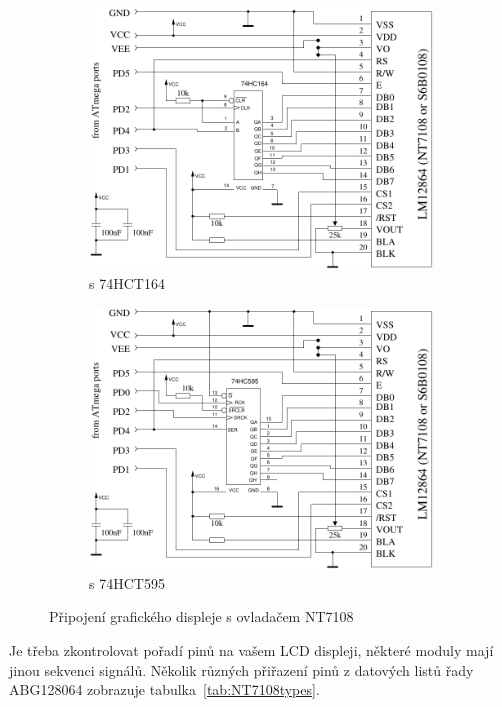 \begin{figure}[H]
  \begin{subfigure}[b]{.5\textwidth}
    \centering
    \includegraphics[width=.9\textwidth]{../FIG/ST7108serial164.pdf}
    \caption{s 74HCT164}
  \end{subfigure}
  \begin{subfigure}[b]{.5\textwidth}
    \centering
    \includegraphics[width=.9\textwidth]{../FIG/ST7108serial595.pdf}
    \caption{s 74HCT595}
  \end{subfigure}
  \caption{Připojení grafického displeje s ovladačem NT7108}
  \label{fig:NT7108lcd}
\end{figure}

Je třeba zkontrolovat pořadí pinů na vašem LCD displeji, některé moduly mají jinou sekvenci signálů.
Několik různých přiřazení pinů z datových listů řady ABG128064 zobrazuje tabulka~\ref{tab:NT7108types}.

